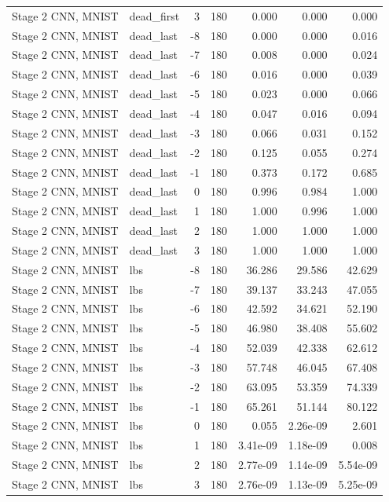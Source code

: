\begin{table}[htbp]
{\begin{tabular}{@{}llrrrrr@{}}
Stage 2 CNN, MNIST & dead\_first & 3 & 180 & 0.000 & 0.000 & 0.000 \\
Stage 2 CNN, MNIST & dead\_last & -8 & 180 & 0.000 & 0.000 & 0.016 \\
Stage 2 CNN, MNIST & dead\_last & -7 & 180 & 0.008 & 0.000 & 0.024 \\
Stage 2 CNN, MNIST & dead\_last & -6 & 180 & 0.016 & 0.000 & 0.039 \\
Stage 2 CNN, MNIST & dead\_last & -5 & 180 & 0.023 & 0.000 & 0.066 \\
Stage 2 CNN, MNIST & dead\_last & -4 & 180 & 0.047 & 0.016 & 0.094 \\
Stage 2 CNN, MNIST & dead\_last & -3 & 180 & 0.066 & 0.031 & 0.152 \\
Stage 2 CNN, MNIST & dead\_last & -2 & 180 & 0.125 & 0.055 & 0.274 \\
Stage 2 CNN, MNIST & dead\_last & -1 & 180 & 0.373 & 0.172 & 0.685 \\
Stage 2 CNN, MNIST & dead\_last & 0 & 180 & 0.996 & 0.984 & 1.000 \\
Stage 2 CNN, MNIST & dead\_last & 1 & 180 & 1.000 & 0.996 & 1.000 \\
Stage 2 CNN, MNIST & dead\_last & 2 & 180 & 1.000 & 1.000 & 1.000 \\
Stage 2 CNN, MNIST & dead\_last & 3 & 180 & 1.000 & 1.000 & 1.000 \\
Stage 2 CNN, MNIST & lbs & -8 & 180 & 36.286 & 29.586 & 42.629 \\
Stage 2 CNN, MNIST & lbs & -7 & 180 & 39.137 & 33.243 & 47.055 \\
Stage 2 CNN, MNIST & lbs & -6 & 180 & 42.592 & 34.621 & 52.190 \\
Stage 2 CNN, MNIST & lbs & -5 & 180 & 46.980 & 38.408 & 55.602 \\
Stage 2 CNN, MNIST & lbs & -4 & 180 & 52.039 & 42.338 & 62.612 \\
Stage 2 CNN, MNIST & lbs & -3 & 180 & 57.748 & 46.045 & 67.408 \\
Stage 2 CNN, MNIST & lbs & -2 & 180 & 63.095 & 53.359 & 74.339 \\
Stage 2 CNN, MNIST & lbs & -1 & 180 & 65.261 & 51.144 & 80.122 \\
Stage 2 CNN, MNIST & lbs & 0 & 180 & 0.055 & 2.26e-09 & 2.601 \\
Stage 2 CNN, MNIST & lbs & 1 & 180 & 3.41e-09 & 1.18e-09 & 0.008 \\
Stage 2 CNN, MNIST & lbs & 2 & 180 & 2.77e-09 & 1.14e-09 & 5.54e-09 \\
Stage 2 CNN, MNIST & lbs & 3 & 180 & 2.76e-09 & 1.13e-09 & 5.25e-09 \\

\end{tabular}}
\end{table}
